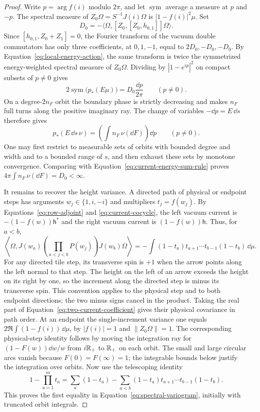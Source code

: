 \begin{proof}
Write $p=\arg f(i)$ modulo $2\pi$, and let $\operatorname{sym}$
average a measure at $p$ and $-p$.  The spectral measure of
$Z_0\Omega=S^{-1}J(i)\Omega$ is $|1-f(i)|^2\mu$.
Set
\[
 D_0=-\langle\Omega,[Z_0,[Z_0,h_{0,1}]]\Omega\rangle.
\]
Since $[h_{0,1},Z_0+Z_1]=0$, the Fourier transform of the vacuum
double commutators has only three coefficients, at $0,1,-1$,
equal to $2D_0,-D_0,-D_0$.  By
Equation~\eqref{eq:local-energy-action}, the same transform is
twice the symmetrized energy-weighted spectral measure of
$Z_0\Omega$.  Dividing by $|1-e^{ip}|^2$ on compact subsets of
$p\ne0$ gives
\begin{equation}\label{eq:current-energy-sum-rule}
 2\operatorname{sym}\bigl(p_*(E\mu)\bigr)
 =D_0\frac{\dd p}{2\pi}\qquad(p\ne0).
\end{equation}
On a degree-$2n_F$ orbit the boundary phase is strictly decreasing
and makes $n_F$ full turns along the positive imaginary ray.  The
change of variables $-\dd p=E\,\dd s$ therefore gives
\[
 p_*(E\,\dd s\,\nu)=\left(\int n_F\,\nu(\dd F)\right)\dd p
 \qquad(p\ne0).
\]
One may first restrict to measurable sets of orbits with bounded
degree and width and to a bounded range of $s$, and then exhaust
these sets by monotone convergence.  Comparing with
Equation~\eqref{eq:current-energy-sum-rule} proves
$4\pi\int n_F\,\nu(\dd F)=D_0<\infty$.

It remains to recover the height variance.  A directed path of
physical or endpoint steps has arguments $w_j\in\{1,i,-i\}$ and
multipliers $t_j=f(w_j)$.  By
Equations~\eqref{eq:row-adjoint} and \eqref{eq:current-cocycle},
the left vacuum current is $-(1-f(w))\mathsf h^*$ and the right
vacuum current is $(1-f(w))\mathsf h$.  Thus, for $a<b$,
\begin{equation}\label{eq:two-current-coefficient}
 \left\langle\Omega,
 J(w_a)\left(\prod_{a<j<b}P(w_j)\right)J(w_b)\Omega\right\rangle
 =-\int(1-t_a)t_{a+1}\cdots t_{b-1}(1-t_b)\,\dd\mu.
\end{equation}
For any directed tile step, its transverse spin is $+1$ when the
arrow points along the left normal to that step.  The height on
the left of an arrow exceeds the height on its right by one, so
the increment along the directed step is minus its transverse
spin.  This convention applies to the physical step and to both
endpoint directions; the two minus signs cancel in the product.
Taking the real part
of Equation~\eqref{eq:two-current-coefficient} gives their physical
covariance in path order.  At an endpoint the
single-increment variance one equals
$2\Re\int(1-f(i))\,\dd\mu$, by $|f(i)|=1$ and
$\|Z_0\Omega\|=1$.  The corresponding physical-step identity
follows by moving the integration ray for
$(1-F(w))\dd w/w$ from $i\mathbb R_+$ to $\mathbb R_+$ on each orbit.
The small and large circular arcs vanish because
$F(0)=F(\infty)=1$; the integrable bounds below justify the
integration over orbits.  Now use the telescoping identity
\[
 1-\prod_{a=1}^m t_a
 =\sum_a(1-t_a)
  -\sum_{a<b}(1-t_a)t_{a+1}\cdots t_{b-1}(1-t_b).
\]
This proves the first equality in
Equation~\eqref{eq:spectral-variogram}, initially with truncated
orbit integrals.


\end{proof}
